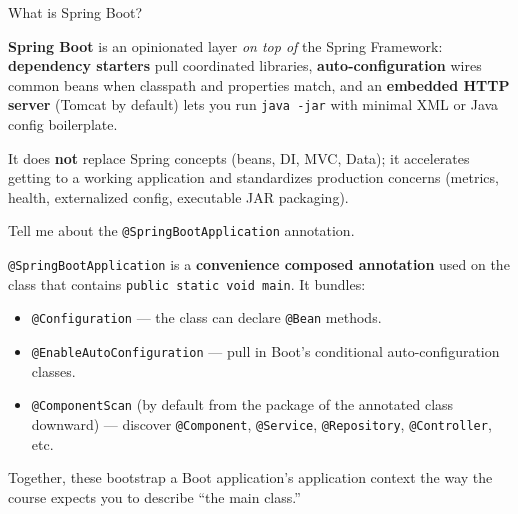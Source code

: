




\question[4]
What is Spring Boot?
\begin{solutionorbox}[1.25in]
  \textbf{Spring Boot} is an opinionated layer \emph{on top of} the Spring Framework: \textbf{dependency starters} pull coordinated libraries, \textbf{auto-configuration} wires common beans when classpath and properties match, and an \textbf{embedded HTTP server} (Tomcat by default) lets you run \texttt{java -jar} with minimal XML or Java config boilerplate.

  It does \textbf{not} replace Spring concepts (beans, DI, MVC, Data); it accelerates getting to a working application and standardizes production concerns (metrics, health, externalized config, executable JAR packaging).
\end{solutionorbox}

\question[4]
Tell me about the \texttt{@SpringBootApplication} annotation.
\begin{solutionorbox}[1.35in]
  \texttt{@SpringBootApplication} is a \textbf{convenience composed annotation} used on the class that contains \texttt{public static void main}. It bundles:
  \begin{itemize}
    \item \texttt{@Configuration} --- the class can declare \texttt{@Bean} methods.
    \item \texttt{@EnableAutoConfiguration} --- pull in Boot's conditional auto-configuration classes.
    \item \texttt{@ComponentScan} (by default from the package of the annotated class downward) --- discover \texttt{@Component}, \texttt{@Service}, \texttt{@Repository}, \texttt{@Controller}, etc.
  \end{itemize}
  Together, these bootstrap a Boot application's application context the way the course expects you to describe ``the main class.''
\end{solutionorbox}

